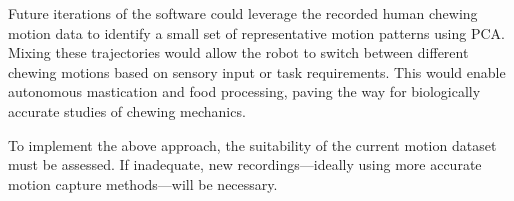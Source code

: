 Future iterations of the software could leverage the recorded human chewing motion data to identify a small set of representative motion patterns using PCA. Mixing these trajectories 
would allow the robot to switch between different chewing motions based on sensory input or task requirements. This would enable autonomous mastication and food processing, paving 
the way for biologically accurate studies of chewing mechanics.

To implement the above approach, the suitability of the current motion dataset must be assessed. If inadequate, new recordings—ideally using more accurate motion capture 
methods—will be necessary.


